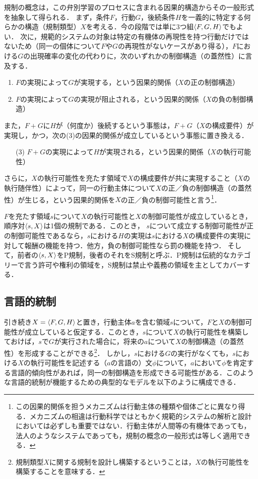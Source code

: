 規制の概念は，この弁別学習のプロセスに含まれる因果的構造からその一般形式を抽象して得られる．
まず，条件$F$，行動$G$，後続条件$H$を一義的に特定する何らかの構造（規制類型）$X$を考える．今の段階では単に3つ組$\langle F,G,H \rangle$でもよい．
次に，規範的システムの対象は特定の有機体の再現性を持つ行動だけではないため（同一の個体について$F$や$G$の再現性がないケースがあり得る），$F$における$G$の出現確率の変化の代わりに，次のいずれかの制御構造（の蓋然性）に言及する．
\begin{enumerate}[label=(\arabic*)]
    \item $F$の実現によって$G$が実現する，という因果的関係（$X$の正の制御構造）
    \item $F$の実現によって$G$の実現が阻止される，という因果的関係（$X$の負の制御構造）
\end{enumerate}
また，$F+G$に$H$が（何度か）後続するという事態は，$F+G$（$X$の構成要件）が実現し，かつ，次の(3)の因果的関係が成立しているという事態に置き換える．
\begin{enumerate}
    \item[(3)] $F+G$の実現によって$H$が実現される，という因果的関係（$X$の執行可能性）
\end{enumerate}
さらに，$X$の執行可能性を充たす領域で$X$の構成要件が共に実現すること（$X$の執行随伴性）によって，同一の行動主体について$X$の正／負の制御構造（の蓋然性）が生じる，という因果的関係を$X$の正／負の制御可能性と言う\footnote{この因果的関係を担うメカニズムは行動主体の種類や個体ごとに異なり得る．メカニズムの相違は行動科学ではともかく規範的システムの解析と設計においては必ずしも重要ではない．行動主体が人間等の有機体であっても，法人のようなシステムであっても，規制の概念の一般形式は等しく適用できる．}．

$F$を充たす領域$s$について$X$の執行可能性と$X$の制御可能性が成立しているとき，順序対$\langle s,X \rangle$は1個の規制である．このとき，
$s$について成立する制御可能性が正の制御可能性であるなら，$s$における$H$の実現は$s$における$X$の構成要件の実現に対して報酬の機能を持つ．他方，負の制御可能性なら罰の機能を持つ．
そして，前者の$\langle s,X \rangle$をP規制，後者のそれをS規制と呼ぶ．P規制は伝統的なカテゴリーで言う許可や権利の領域を，S規制は禁止や義務の領域を主としてカバーする．

\subsection{言語的統制}

引き続き$X=\langle F,G,H \rangle$と置き，行動主体$a$を含む領域$s$について，$F$と$X$の制御可能性が成立していると仮定する．このとき，$s$について$X$の執行可能性を構築しておけば，$s$で$G$が実行された場合に，将来の$a$について$X$の制御構造（の蓋然性）を形成することができる\footnote{規制類型$X$に関する規制を設計し構築するということは，$X$の執行可能性を構築することを意味する．}．
しかし，$s$における$G$の実行がなくても，$s$における$X$の執行可能性を記述する（$a$の言語の）文$\phi$について，$a$において$\phi$を肯定する言語的傾向性があれば，同一の制御構造を形成できる可能性がある．このような言語的統制が機能するための典型的なモデルを以下のように構成できる．

